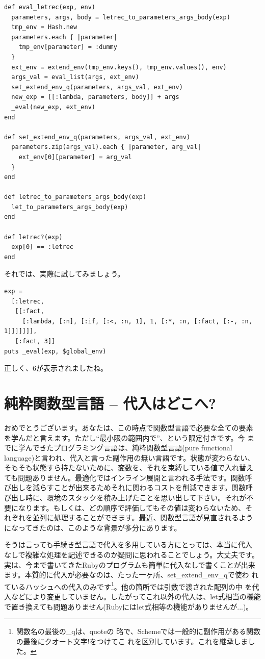 \begin{lstlisting}
def eval_letrec(exp, env)
  parameters, args, body = letrec_to_parameters_args_body(exp)
  tmp_env = Hash.new
  parameters.each { |parameter| 
    tmp_env[parameter] = :dummy
  }
  ext_env = extend_env(tmp_env.keys(), tmp_env.values(), env)
  args_val = eval_list(args, ext_env)
  set_extend_env_q(parameters, args_val, ext_env)
  new_exp = [[:lambda, parameters, body]] + args
  _eval(new_exp, ext_env)
end

def set_extend_env_q(parameters, args_val, ext_env)
  parameters.zip(args_val).each { |parameter, arg_val|
    ext_env[0][parameter] = arg_val
  }
end

def letrec_to_parameters_args_body(exp)
  let_to_parameters_args_body(exp)
end

def letrec?(exp)
  exp[0] == :letrec
end
\end{lstlisting}

それでは、実際に試してみましょう。

\begin{lstlisting}
exp =
  [:letrec, 
   [[:fact,
     [:lambda, [:n], [:if, [:<, :n, 1], 1, [:*, :n, [:fact, [:-, :n, 1]]]]]]], 
   [:fact, 3]]
puts _eval(exp, $global_env)
\end{lstlisting}

正しく、6が表示されましたね。

\section{純粋関数型言語 -- 代入はどこへ?}

おめでとうございます。あなたは、この時点で関数型言語で必要な全ての要素
を学んだと言えます。ただし“最小限の範囲内で”、という限定付きです。今
までに学んできたプログラミング言語は、純粋関数型言語(pure functional
language)と言われ、代入と言った副作用の無い言語です。状態が変わらない、
そもそも状態すら持たないために、変数を、それを束縛している値で入れ替え
ても問題ありません。最適化ではインライン展開と言われる手法です。関数呼
び出しを減らすことが出来るためそれに関わるコストを削減できます。関数呼
び出し時に、環境のスタックを積み上げたことを思い出して下さい。それが不
要になります。もしくは、どの順序で評価してもその値は変わらないため、そ
れぞれを並列に処理することができます。最近、関数型言語が見直されるよう
になってきたのは、このような背景が多分にあります。

そうは言っても手続き型言語で代入を多用している方にとっては、本当に代入
なしで複雑な処理を記述できるのか疑問に思われることでしょう。大丈夫です。
実は、今まで書いてきたRubyのプログラムも簡単に代入なしで書くことが出来
ます。本質的に代入が必要なのは、たった一ヶ所、set\_extend\_env\_qで使わ
れているハッシュへの代入のみです\footnote{関数名の最後の\_qは、quoteの
略で、Schemeでは一般的に副作用がある関数の最後にクオート文字!をつけてこ
れを区別しています。これを継承しました。}。他の箇所では引数で渡された配列の中
を代入などにより変更していません。したがってこれ以外の代入は、let式相当の機能
で置き換えても問題ありません(Rubyにはlet式相等の機能がありませんが...)。

